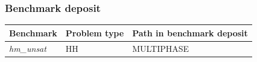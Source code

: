 \subsubsection*{\upshape\textbf{Benchmark deposit}}
\begin{tabular}{|l|l|l|}
\hline
Benchmark & Problem type & Path in benchmark deposit \\
\hline
\emph{hm\_unsat}& HH & MULTIPHASE \\
\hline
\end{tabular}
\clearpage
